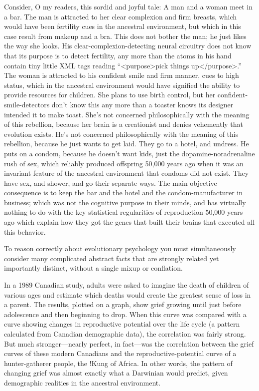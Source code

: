 {
 Consider, O my readers, this sordid and joyful tale: A man and a
woman meet in a bar. The man is attracted to her clear complexion and
firm breasts, which would have been fertility cues in the ancestral
environment, but which in this case result from makeup and a bra. This
does not bother the man; he just likes the way she looks. His
clear-complexion-detecting neural circuitry does not know that its
purpose is to detect fertility, any more than the atoms in his hand
contain tiny little XML tags reading
``{\textless}purpose{\textgreater}pick things
up{\textless}/purpose{\textgreater}.'' The woman is
attracted to his confident smile and firm manner, cues to high status,
which in the ancestral environment would have signified the ability to
provide resources for children. She plans to use birth control, but her
confident-smile-detectors don't know this any more than
a toaster knows its designer intended it to make toast.
She's not concerned philosophically with the meaning of
this rebellion, because her brain is a creationist and denies
vehemently that evolution exists. He's not concerned
philosophically with the meaning of this rebellion, because he just
wants to get laid. They go to a hotel, and undress. He puts on a
condom, because he doesn't want kids, just the
dopamine-noradrenaline rush of sex, which reliably produced offspring
50,000 years ago when it was an invariant feature of the ancestral
environment that condoms did not exist. They have sex, and shower, and
go their separate ways. The main objective consequence is to keep the
bar and the hotel and the condom-manufacturer in business; which was
not the cognitive purpose in their minds, and has virtually nothing to
do with the key statistical regularities of reproduction 50,000 years
ago which explain how they got the genes that built their brains that
executed all this behavior.}

{
 To reason correctly about evolutionary psychology you must
simultaneously consider many complicated abstract facts that are
strongly related yet importantly distinct, without a single mixup or
conflation.}

\myendsectiontext


{
 In a 1989 Canadian study, adults were asked to imagine the death
of children of various ages and estimate which deaths would create the
greatest sense of loss in a parent. The results, plotted on a graph,
show grief growing until just before adolescence and then beginning to
drop. When this curve was compared with a curve showing changes in
reproductive potential over the life cycle (a pattern calculated from
Canadian demographic data), the correlation was fairly strong. But much
stronger---nearly perfect, in fact---was the correlation between the
grief curves of these modern Canadians and the reproductive-potential
curve of a hunter-gatherer people, the !Kung of Africa. In other words,
the pattern of changing grief was almost exactly what a Darwinian would
predict, given demographic realities in the ancestral environment.}

